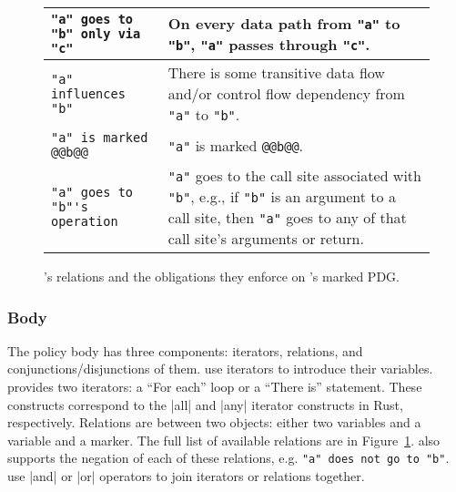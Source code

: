 \begin{figure}[t]
\begin{tabular}{|p{5.5cm}|p{8cm}|}
        \hline
        \lstinline[language=CNL]|"a" goes to "b" only via "c"|                    &  On every data path from \lstinline[language=CNL]|"a"| to \lstinline[language=CNL]|"b"|,
                                                                                    \lstinline[language=CNL]|"a"| passes through \lstinline[language=CNL]|"c"|. \\
        \hline
        \lstinline[language=CNL]|"a" influences "b"|                              &  There is some transitive data flow and/or control flow dependency from  \lstinline[language=CNL]|"a"| to \lstinline[language=CNL]|"b"|.  \\
        \hline
        \lstinline[language=CNL]|"a" is marked @@b@@|                             & \lstinline[language=CNL]|"a"| is marked \lstinline[language=CNL]|@@b@@|. \\
        \hline
        \lstinline[language=CNL]|"a" goes to "b"'s operation|                     & \lstinline[language=CNL]|"a"| goes to the call site associated with \lstinline[language=CNL]|"b"|,
                                                                                    e.g., if \lstinline[language=CNL]|"b"| is an argument to a call site, then \lstinline[language=CNL]|"a"| goes to any of that call site's arguments or return. \\        
      \hline
    \end{tabular}
      \caption{\syslang's relations and the obligations they enforce on \sys's marked PDG.}
      \label{f:relations}
  \end{figure}

\subsubsection{Body}
\label{sec:body}

The policy body has three components: iterators, relations, and conjunctions/disjunctions of them.
%
\Ces{} use iterators to introduce their variables.
%
\syslang{} provides two iterators: a ``For each'' loop or a ``There is'' statement.
%
These constructs correspond to the |all| and |any| iterator constructs in Rust, respectively.
%
%
Relations are between two objects: either two variables and a variable and a marker.
%
The full list of available relations are in Figure~\ref{f:relations}.
%
\syslang{} also supports the negation of each of these relations, e.g. \lstinline[language=CNL]|"a" does not go to "b"|.
%
\Ces{} use |and| or |or| operators to join iterators or relations together.


